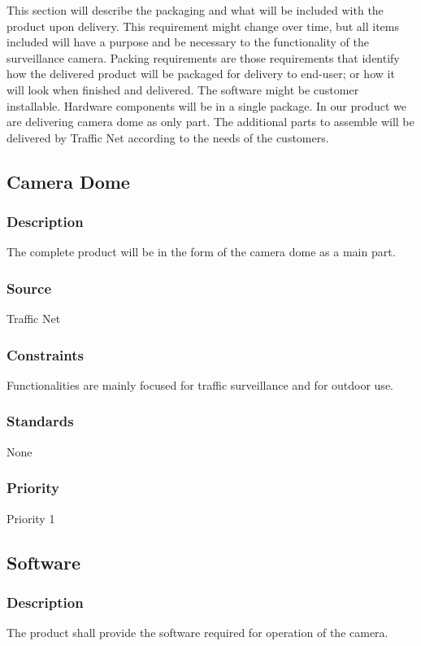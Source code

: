 This section will describe the packaging and what will be included with the product upon delivery. This requirement might change over time, but all items included will have a purpose and be necessary to the functionality of the surveillance camera. Packing requirements are those requirements that identify how the delivered product will be packaged for delivery to end-user; or how it will look when finished and delivered. The software might be customer installable. Hardware components will be in a single package. In our product we are delivering camera dome as only part. The additional parts to assemble will be delivered by Traffic Net according to the needs of the customers.


\subsection{Camera Dome}
\subsubsection{Description}
The complete product will be in the form of the camera dome as a main part.

\subsubsection{Source}
Traffic Net

\subsubsection{Constraints}
Functionalities are mainly focused for traffic surveillance and for outdoor use.

\subsubsection{Standards}
None

\subsubsection{Priority}
Priority 1

\subsection{Software}
\subsubsection{Description}
The product shall provide the software required for operation of the camera.

